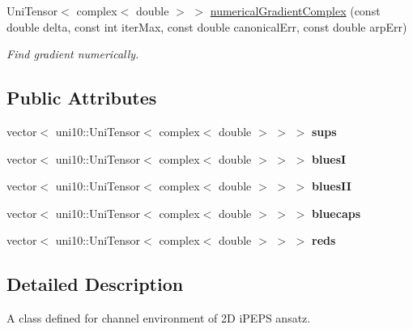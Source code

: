 \begin{DoxyCompactItemize}
\item 
Uni\+Tensor$<$ complex$<$ double $>$ $>$ \hyperlink{classchannel_a7758d3748e69e7f3a2083097bb3b425c}{numerical\+Gradient\+Complex} (const double delta, const int iter\+Max, const double canonical\+Err, const double arp\+Err)\hypertarget{classchannel_a7758d3748e69e7f3a2083097bb3b425c}{}\label{classchannel_a7758d3748e69e7f3a2083097bb3b425c}

\begin{DoxyCompactList}\small\item\em Find gradient numerically. \end{DoxyCompactList}\end{DoxyCompactItemize}
\subsection*{Public Attributes}
\begin{DoxyCompactItemize}
\item 
vector$<$ uni10\+::\+Uni\+Tensor$<$ complex$<$ double $>$ $>$ $>$ {\bfseries sups}\hypertarget{classchannel_ad20e555228495666f57f7597b185c2eb}{}\label{classchannel_ad20e555228495666f57f7597b185c2eb}

\item 
vector$<$ uni10\+::\+Uni\+Tensor$<$ complex$<$ double $>$ $>$ $>$ {\bfseries bluesI}\hypertarget{classchannel_ac79abbc9fb627d101ec8cd6bedd192cf}{}\label{classchannel_ac79abbc9fb627d101ec8cd6bedd192cf}

\item 
vector$<$ uni10\+::\+Uni\+Tensor$<$ complex$<$ double $>$ $>$ $>$ {\bfseries blues\+II}\hypertarget{classchannel_a473096b5e2b2826d0030db24a7bf88b8}{}\label{classchannel_a473096b5e2b2826d0030db24a7bf88b8}

\item 
vector$<$ uni10\+::\+Uni\+Tensor$<$ complex$<$ double $>$ $>$ $>$ {\bfseries bluecaps}\hypertarget{classchannel_a2742aef57cab734f8053db4e33069796}{}\label{classchannel_a2742aef57cab734f8053db4e33069796}

\item 
vector$<$ uni10\+::\+Uni\+Tensor$<$ complex$<$ double $>$ $>$ $>$ {\bfseries reds}\hypertarget{classchannel_aa60b6a2febb39324aa6c162751c16249}{}\label{classchannel_aa60b6a2febb39324aa6c162751c16249}

\end{DoxyCompactItemize}


\subsection{Detailed Description}
A class defined for channel environment of 2D i\+P\+E\+PS ansatz. 

